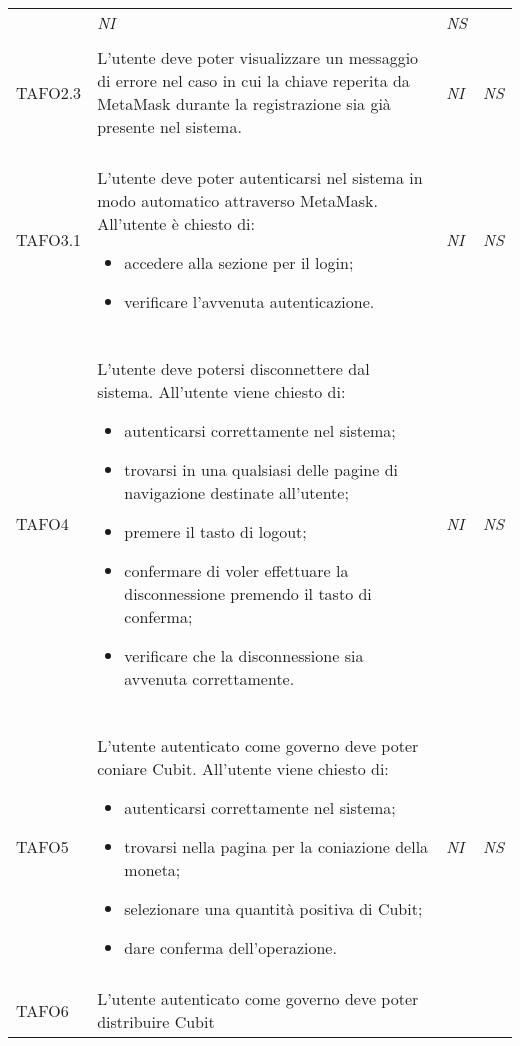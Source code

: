 \begin{longtable}{ >{\centering}p{} >{}p{}
			>{\centering}p{} >{\centering}p{}}
\begin{itemize}
		 \end{itemize} & \textit{NI} & \textit{NS}\\ \tabularnewline
\hypertarget{TAFO2.3}{TAFO2.3} & L'utente deve poter visualizzare un messaggio di errore nel caso in cui la
		 chiave reperita da MetaMask\glo{} durante la registrazione sia già presente
		 nel sistema. & \textit{NI} & \textit{NS}\\ \tabularnewline
\hypertarget{TAFO3.1}{TAFO3.1} & L'utente deve poter autenticarsi nel sistema in modo automatico attraverso
		 MetaMask\glo{}. All'utente è chiesto di:
		 \begin{itemize}
		 	\item accedere alla sezione per il login;
		 	\item verificare l'avvenuta autenticazione.
		 \end{itemize} & \textit{NI} & \textit{NS}\\ \tabularnewline
\hypertarget{TAFO4}{TAFO4} & L'utente deve potersi disconnettere dal sistema. All'utente viene chiesto di:
		 \begin{itemize}
		 	\item autenticarsi correttamente nel sistema;
		 	\item trovarsi in una qualsiasi delle pagine di navigazione destinate 
		 	all'utente;
		 	\item premere il tasto di logout;
		 	\item confermare di voler effettuare la disconnessione premendo il tasto 
		 	di conferma;
		 	\item verificare che la disconnessione sia avvenuta correttamente.
		 \end{itemize} & \textit{NI} & \textit{NS}\\ \tabularnewline
\hypertarget{TAFO5}{TAFO5} & L'utente autenticato come governo deve poter coniare Cubit\glo{}.
		 All'utente viene chiesto di:
		 \begin{itemize}
		 	\item autenticarsi correttamente nel sistema;
		 	\item trovarsi nella pagina per la coniazione della moneta;
		 	\item selezionare una quantità positiva di Cubit\glo{};
		 	\item dare conferma dell'operazione. 
		 \end{itemize} & \textit{NI} & \textit{NS}\\ \tabularnewline
\hypertarget{TAFO6}{TAFO6} & L'utente autenticato come governo deve poter distribuire Cubit\glo{}

\end{longtable}
